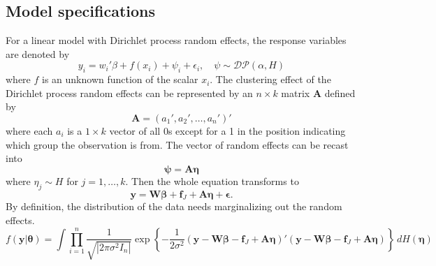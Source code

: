 \documentclass[11pt]{article}
\newcommand{\bs}{\boldsymbol}
\begin{document}
\subsection{Model specifications}
For a linear model with Dirichlet process random effects, the response variables are denoted by
$$
  y_{i} = w_{i}'\beta + f\left(x_{i}\right) + \psi_{i}+\epsilon_{i}, \quad \psi \sim \mathcal{DP}\left(\alpha, H\right)
$$
where $f$ is an unknown function of the scalar $x_{i}$. The clustering effect of the Dirichlet process random effects can be represented by an $n \times k$ matrix $\bs{A}$ defined by
$$
  \bs{A} = \left(a_{1}', a_{2}', \ldots , a_{n}'\right)'
$$
where each $a_{i}$ is a $1 \times k$ vector of all 0s except for a 1 in the position indicating which group the observation is from. The vector of random effects can be recast into
$$
  \bs{\psi} = \bs{A\eta}
$$
where $\eta_{j} \sim H$ for $j= 1, \ldots , k$. Then the whole equation transforms to
$$
  \bs{y} = \bs{W\beta} + \bs{f}_{J} + \bs{A\eta} + \bs{\epsilon}.
$$
By definition, the distribution of the data needs marginalizing out the random effects.
$$
  f\left(\bs{y}|\bs{\theta}\right) = \int \prod_{i=1}^{n}\frac{1}{\sqrt{\left|2\pi\sigma^{2}I_{n} \right|}}\exp \left\{-\frac{1}{2\sigma^{2}}\left(\bs{y}-\bs{W\beta}-\bs{f}_{J}+\bs{A\eta}\right)'\left(\bs{y}-\bs{W\beta}-\bs{f}_{J}+\bs{A\eta}\right) \right\}\, dH\left(\bs{\eta}\right)
$$
\end{document}
